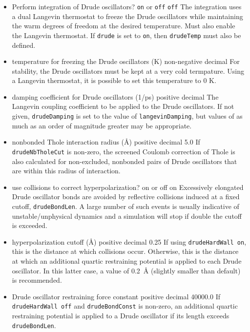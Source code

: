 \begin{itemize}

\item{}
{Perform integration of Drude oscillators?}
{{\tt on} or {\tt off}}
{{\tt off}}
{
The integration uses a dual Langevin thermostat to freeze the Drude
  oscillators while maintaining the warm degrees of freedom at the desired
  temperature.
Must also enable the Langevin thermostat.
If {\tt drude} is set to {\tt on}, then {\tt drudeTemp} must also be defined.
}

\item{}
{temperature for freezing the Drude oscillators (K)}
{non-negative decimal}
{
For stability, the Drude oscillators must be kept at a very cold termpature.
Using a Langevin thermostat, it is possible to set this temperature to 0 K.
}

\item{}
{damping coefficient for Drude oscillators (1/ps)}
{positive decimal}
{
The Langevin coupling coefficient to be applied to the Drude oscillators.
If not given, {\tt drudeDamping} is set to the value of {\tt langevinDamping},
  but values of as much as an order of magnitude greater may be appropriate.
}

\item{}
{nonbonded Thole interaction radius (\AA)}
{positive decimal}
{5.0}
{
If {\tt drudeNbTholeCut} is non-zero, the screened Coulomb correction of Thole
  is also calculated for non-excluded, nonbonded pairs of Drude oscillators
  that are within this radius of interaction.
}

\item{}
{use collisions to correct hyperpolarization?}
{on or off}
{on}
{
Excessively elongated Drude oscillator bonds are avoided by reflective
  collisions induced at a fixed cutoff, {\tt drudeBondLen}.
A large number of such events is usually indicative of unstable/unphysical
  dynamics and a simulation will stop if double the cutoff is exceeded.
}

\item{}
{hyperpolarization cutoff (\AA)}
{positive decimal}
{0.25}
{
If using {\tt drudeHardWall on}, this is the distance at which collisions
  occur.
Otherwise, this is the distance at which an additional quartic restraining
  potential is applied to each Drude oscillator.
In this latter case, a value of 0.2~\AA{} (slightly smaller than default) is
  recommended.
}

\item{}
{Drude oscillator restraining force constant}
{positive decimal}
{40000.0}
{
If {\tt drudeHardWall off} and {\tt drudeBondConst} is non-zero, an additional
  quartic restraining potential is applied to a Drude oscillator if its length
  exceeds {\tt drudeBondLen}.
}

\end{itemize}


